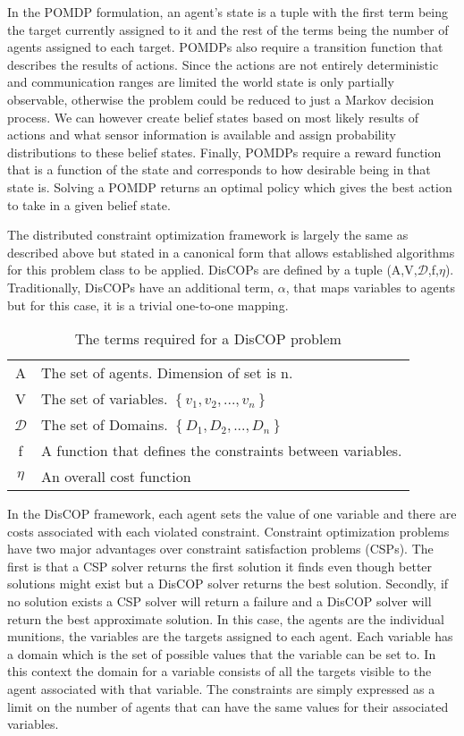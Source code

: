 \documentclass{article}
\begin{document}
In the POMDP formulation, an agent's state is a tuple with the first term being the target currently assigned to it and the rest of the terms being the number of agents assigned to each target.  POMDPs also require a transition function that describes the results of actions. Since the actions are not entirely deterministic and communication ranges are limited the world state is only partially observable, otherwise the problem could be reduced to just a Markov decision process. We can however create belief states based on most likely results of actions and what sensor information is available and assign probability distributions to these belief states. Finally, POMDPs require a reward function that is a function of the state and corresponds to how desirable being in that state is. Solving a POMDP returns an optimal policy which gives the best action to take in a given belief state.

The distributed constraint optimization framework is largely the same as described above but stated in a canonical form that allows established algorithms for this problem class to be applied. DisCOPs are defined by a tuple (A,V,$\mathcal{D}$,f,$\eta$). Traditionally, DisCOPs have an additional term, $\alpha$, that maps variables to agents but for this case, it is a trivial one-to-one mapping.
\begin{table}[h!]
\centering
\begin{tabular}{cl}
A &The set of agents. Dimension of set is n.\\
V &The set of variables. $\left\{v_{1},v_{2},...,v_{n}\right\}$\\
$\mathcal{D}$ &The set of Domains. $\left\lbrace D_{1},D_{2},...,D_{n}\right\rbrace$\\
f &A function that defines the constraints between variables.\\
$\eta$ &An overall cost function
\end{tabular}
\caption{The terms required for a DisCOP problem}
\end{table}

In the DisCOP framework, each agent sets the value of one variable and there are costs associated with each violated constraint. Constraint optimization problems have two major advantages over constraint satisfaction problems (CSPs). The first is that a CSP solver returns the first solution it finds even though better solutions might exist but a DisCOP solver returns the best solution. Secondly, if no solution exists a CSP solver will return a failure and a DisCOP solver will return  the best approximate solution. In this case, the agents are the individual munitions, the variables are the targets assigned to each agent. Each variable has a domain which is the set of possible values that the variable can be set to. In this context the domain for a variable consists of all the targets visible to the agent associated with that variable. The constraints are simply expressed as a limit on the number of agents that can have the same values for their associated variables.
\end{document}
